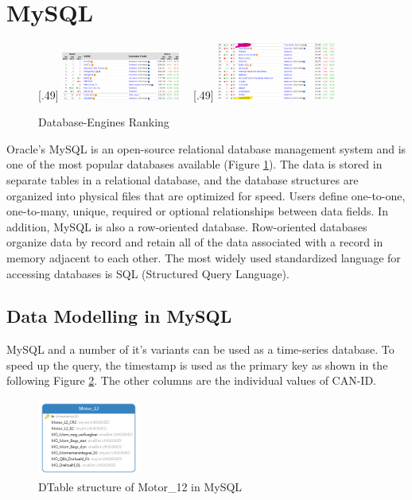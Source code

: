 \section{MySQL}
\begin{figure}[htb]
	\centering	
	\subcaptionbox{ %
		\label{fig:example_2}}%
 		[.49\linewidth]{
  		\includegraphics[width=0.35\textwidth]{gfx/database_ranking.png} 	
  	}  	
  	~
  	\subcaptionbox{ %
  		\label{fig:example_3}}
 		[.49\linewidth]{
  		\includegraphics[width=0.35\textwidth]{gfx/database_ranking2.png}  	
  	}	  
  		
	\caption{Database-Engines Ranking\cite{db}}
	\label{fig:database_ranking}
\end{figure}
Oracle's MySQL is an open-source relational database management system and is one of the most popular databases available (Figure \ref{fig:database_ranking}). The data is stored in separate tables in a relational database, and the database structures are organized into physical files that are optimized for speed\cite{mysql}. Users define one-to-one, one-to-many, unique, required or optional relationships between data fields\cite{mysql}. In addition, MySQL is also a row-oriented database. Row-oriented databases organize data by record and retain all of the data associated with a record in memory adjacent to each other. The most widely used standardized language for accessing databases is SQL (Structured Query Language).

\subsection{Data Modelling in MySQL}
MySQL and a number of it's variants can be used as a time-series database\cite{timestored.com}. To speed up the query, the timestamp is used as the primary key as shown in the following Figure \ref{fig:mysql_model}. The other columns are the individual values of CAN-ID.

\begin{figure}[hbt!]
    \centering
    \includegraphics[width=0.3\textwidth]{gfx/mysql_model.png}
    \caption{DTable structure of Motor\_12 in MySQL}
    \label{fig:mysql_model}
\end{figure}

